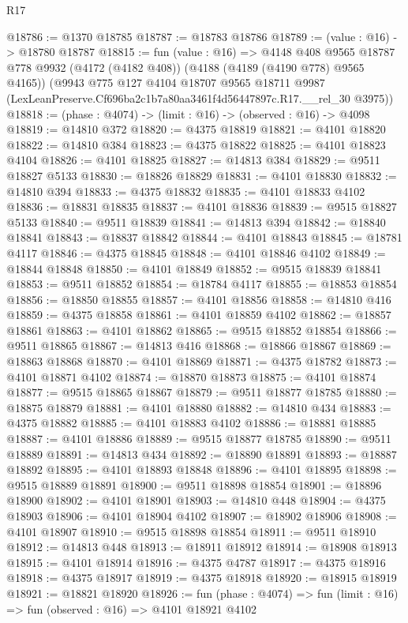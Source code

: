 \begin{lexlean}{R17}
\begin{coremodule}
@18786 := @1370 @18785
@18787 := @18783 @18786
@18789 := (value : @16) -> @18780 @18787
@18815 := fun (value : @16) =>
  @4148
    @408
    @9565
    @18787
    @778
    @9932
    (@4172 (@4182 @408))
    (@4188 (@4189 (@4190 @778) @9565 @4165))
    (@9943
      @775
      @127
      @4104
      @18707
      @9565
      @18711
      @9987
      (LexLeanPreserve.Cf696ba2c1b7a80aa3461f4d56447897c.R17.__rel_30 @3975))
@18818 := (phase : @4074) -> (limit : @16) -> (observed : @16) -> @4098
@18819 := @14810 @372
@18820 := @4375 @18819
@18821 := @4101 @18820
@18822 := @14810 @384
@18823 := @4375 @18822
@18825 := @4101 @18823 @4104
@18826 := @4101 @18825
@18827 := @14813 @384
@18829 := @9511 @18827 @5133
@18830 := @18826 @18829
@18831 := @4101 @18830
@18832 := @14810 @394
@18833 := @4375 @18832
@18835 := @4101 @18833 @4102
@18836 := @18831 @18835
@18837 := @4101 @18836
@18839 := @9515 @18827 @5133
@18840 := @9511 @18839
@18841 := @14813 @394
@18842 := @18840 @18841
@18843 := @18837 @18842
@18844 := @4101 @18843
@18845 := @18781 @4117
@18846 := @4375 @18845
@18848 := @4101 @18846 @4102
@18849 := @18844 @18848
@18850 := @4101 @18849
@18852 := @9515 @18839 @18841
@18853 := @9511 @18852
@18854 := @18784 @4117
@18855 := @18853 @18854
@18856 := @18850 @18855
@18857 := @4101 @18856
@18858 := @14810 @416
@18859 := @4375 @18858
@18861 := @4101 @18859 @4102
@18862 := @18857 @18861
@18863 := @4101 @18862
@18865 := @9515 @18852 @18854
@18866 := @9511 @18865
@18867 := @14813 @416
@18868 := @18866 @18867
@18869 := @18863 @18868
@18870 := @4101 @18869
@18871 := @4375 @18782
@18873 := @4101 @18871 @4102
@18874 := @18870 @18873
@18875 := @4101 @18874
@18877 := @9515 @18865 @18867
@18879 := @9511 @18877 @18785
@18880 := @18875 @18879
@18881 := @4101 @18880
@18882 := @14810 @434
@18883 := @4375 @18882
@18885 := @4101 @18883 @4102
@18886 := @18881 @18885
@18887 := @4101 @18886
@18889 := @9515 @18877 @18785
@18890 := @9511 @18889
@18891 := @14813 @434
@18892 := @18890 @18891
@18893 := @18887 @18892
@18895 := @4101 @18893 @18848
@18896 := @4101 @18895
@18898 := @9515 @18889 @18891
@18900 := @9511 @18898 @18854
@18901 := @18896 @18900
@18902 := @4101 @18901
@18903 := @14810 @448
@18904 := @4375 @18903
@18906 := @4101 @18904 @4102
@18907 := @18902 @18906
@18908 := @4101 @18907
@18910 := @9515 @18898 @18854
@18911 := @9511 @18910
@18912 := @14813 @448
@18913 := @18911 @18912
@18914 := @18908 @18913
@18915 := @4101 @18914
@18916 := @4375 @4787
@18917 := @4375 @18916
@18918 := @4375 @18917
@18919 := @4375 @18918
@18920 := @18915 @18919
@18921 := @18821 @18920
@18926 := fun (phase : @4074) => fun (limit : @16) => fun (observed : @16) => @4101 @18921 @4102

\end{coremodule}
\end{lexlean}
